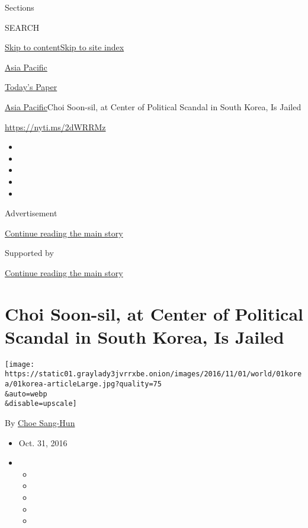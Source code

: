 Sections

SEARCH

\protect\hyperlink{site-content}{Skip to
content}\protect\hyperlink{site-index}{Skip to site index}

\href{https://www.nytimes3xbfgragh.onion/section/world/asia}{Asia
Pacific}

\href{https://myaccount.nytimes3xbfgragh.onion/auth/login?response_type=cookie\&client_id=vi}{}

\href{https://www.nytimes3xbfgragh.onion/section/todayspaper}{Today's
Paper}

\href{/section/world/asia}{Asia Pacific}\textbar{}Choi Soon-sil, at
Center of Political Scandal in South Korea, Is Jailed

\url{https://nyti.ms/2dWRRMz}

\begin{itemize}
\item
\item
\item
\item
\item
\end{itemize}

Advertisement

\protect\hyperlink{after-top}{Continue reading the main story}

Supported by

\protect\hyperlink{after-sponsor}{Continue reading the main story}

\hypertarget{choi-soon-sil-at-center-of-political-scandal-in-south-korea-is-jailed}{%
\section{Choi Soon-sil, at Center of Political Scandal in South Korea,
Is
Jailed}\label{choi-soon-sil-at-center-of-political-scandal-in-south-korea-is-jailed}}

\texttt{[image: https://static01.graylady3jvrrxbe.onion/images/2016/11/01/world/01korea/01korea-articleLarge.jpg?quality=75\\\&auto=webp\\\&disable=upscale]}

By \href{http://www.nytimes3xbfgragh.onion/by/choe-sang-hun}{Choe
Sang-Hun}

\begin{itemize}
\item
  Oct. 31, 2016
\item
  \begin{itemize}
  \item
  \item
  \item
  \item
  \item
  \end{itemize}
\end{itemize}


